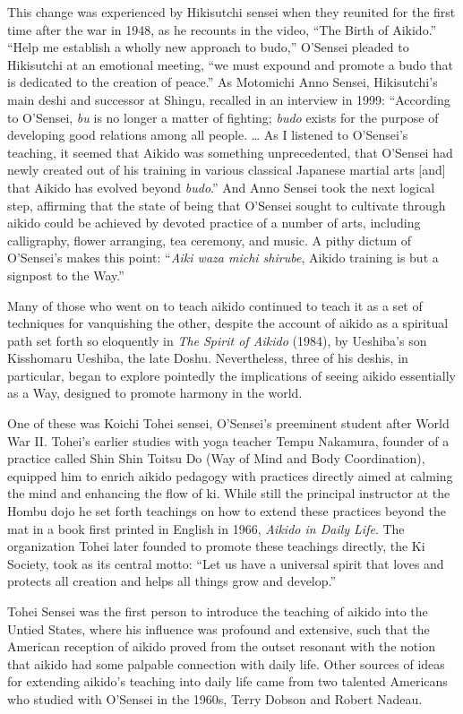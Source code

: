 This change was experienced by Hikisutchi sensei when they reunited for the first time after the war in 1948, as he recounts in the video, ``The Birth of Aikido.'' ``Help me establish a wholly new approach to budo,'' O'Sensei pleaded to Hikisutchi at an emotional meeting, ``we must expound and promote a budo that is dedicated to the creation of peace.'' As Motomichi Anno Sensei, Hikisutchi's main deshi and successor at Shingu, recalled in an interview in 1999: ``According to O'Sensei, \emph{bu} is no longer a matter of fighting; \emph{budo} exists for the purpose of developing good relations among all people. \ldots{} As I listened to O'Sensei's teaching, it seemed that Aikido was something unprecedented, that O'Sensei had newly created out of his training in various classical Japanese martial arts [and] that Aikido has evolved beyond \emph{budo}.'' And Anno Sensei took the next logical step, affirming that the state of being that O'Sensei sought to cultivate through aikido could be achieved by devoted practice of a number of arts, including calligraphy, flower arranging, tea ceremony, and music. A pithy dictum of O'Sensei's makes this point: ``\emph{Aiki waza michi shirube}, Aikido training is but a signpost to the Way.''

Many of those who went on to teach aikido continued to teach it as a set of techniques for vanquishing the other, despite the account of aikido as a spiritual path set forth so eloquently in \emph{The Spirit of Aikido} (1984), by Ueshiba's son Kisshomaru Ueshiba, the late Doshu. Nevertheless, three of his deshis, in particular, began to explore pointedly the implications of seeing aikido essentially as a Way, designed to promote harmony in the world.

One of these was Koichi Tohei sensei, O'Sensei's preeminent student after World War II. Tohei's earlier studies with yoga teacher Tempu Nakamura, founder of a practice called Shin Shin Toitsu Do (Way of Mind and Body Coordination), equipped him to enrich aikido pedagogy with practices directly aimed at calming the mind and enhancing the flow of ki. While still the principal instructor at the Hombu dojo he set forth teachings on how to extend these practices beyond the mat in a book first printed in English in 1966, \emph{Aikido in Daily Life}. The organization Tohei later founded to promote these teachings directly, the Ki Society, took as its central motto: ``Let us have a universal spirit that loves and protects all creation and helps all things grow and develop.''

Tohei Sensei was the first person to introduce the teaching of aikido into the Untied States, where his influence was profound and extensive, such that the American reception of aikido proved from the outset resonant with the notion that aikido had some palpable connection with daily life. Other sources of ideas for extending aikido's teaching into daily life came from two talented Americans who studied with O'Sensei in the 1960s, Terry Dobson and Robert Nadeau. 

